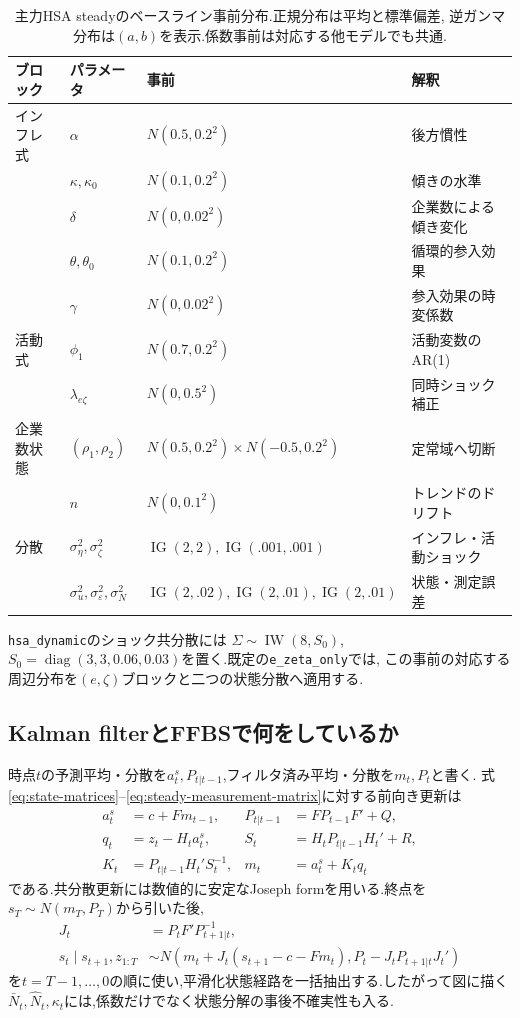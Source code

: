 \documentclass[11pt]{article}
\newcommand{\code}[1]{\texttt{#1}}
\newcommand{\kt}{\kappa_t}
\begin{document}
\begin{table}[H]
\centering
\caption{主力HSA steadyのベースライン事前分布.正規分布は平均と標準偏差,
逆ガンマ分布は$(a,b)$を表示.係数事前は対応する他モデルでも共通.}
\label{tab:baseline-priors}
\small
\begin{tabular}{llll}
\toprule
ブロック & パラメータ & 事前 & 解釈 \\
\midrule
インフレ式 & $\alpha$ & $N(0.5,0.2^2)$ & 後方慣性 \\
 & $\kappa,\kappa_0$ & $N(0.1,0.2^2)$ & 傾きの水準 \\
 & $\delta$ & $N(0,0.02^2)$ & 企業数による傾き変化 \\
 & $\theta,\theta_0$ & $N(0.1,0.2^2)$ & 循環的参入効果 \\
 & $\gamma$ & $N(0,0.02^2)$ & 参入効果の時変係数 \\
活動式 & $\phi_1$ & $N(0.7,0.2^2)$ & 活動変数のAR(1) \\
 & $\lambda_{e\zeta}$ & $N(0,0.5^2)$ & 同時ショック補正 \\
企業数状態 & $(\rho_1,\rho_2)$ & $N(0.5,0.2^2)\times N(-0.5,0.2^2)$ & 定常域へ切断 \\
 & $n$ & $N(0,0.1^2)$ & トレンドのドリフト \\
\midrule
分散 & $\sigma_\eta^2,\sigma_\zeta^2$ & $\operatorname{IG}(2,2),\operatorname{IG}(.001,.001)$ & インフレ・活動ショック \\
 & $\sigma_u^2,\sigma_\varepsilon^2,\sigma_N^2$ & $\operatorname{IG}(2,.02),\operatorname{IG}(2,.01),\operatorname{IG}(2,.01)$ & 状態・測定誤差 \\
\bottomrule
\end{tabular}
\end{table}

\noindent \code{hsa\_dynamic}のショック共分散には
$\Sigma\sim\operatorname{IW}(8,S_0)$,
$S_0=\operatorname{diag}(3,3,0.06,0.03)$を置く.既定の\code{e\_zeta\_only}では,
この事前の対応する周辺分布を$(e,\zeta)$ブロックと二つの状態分散へ適用する.

\subsection{Kalman filterとFFBSで何をしているか}
時点$t$の予測平均・分散を$a_t^s,P_{t|t-1}$,フィルタ済み平均・分散を$m_t,P_t$と書く.
式\eqref{eq:state-matrices}--\eqref{eq:steady-measurement-matrix}に対する前向き更新は
\begin{align}
a_t^s&=c+Fm_{t-1},&P_{t|t-1}&=FP_{t-1}F'+Q,\\
q_t&=z_t-H_ta_t^s,&S_t&=H_tP_{t|t-1}H_t'+R,\\
K_t&=P_{t|t-1}H_t'S_t^{-1},&m_t&=a_t^s+K_tq_t
\end{align}
である.共分散更新には数値的に安定なJoseph formを用いる.終点を
$s_T\sim N(m_T,P_T)$から引いた後,
\begin{align}
J_t&=P_tF'P_{t+1|t}^{-1},\\
s_t\mid s_{t+1},z_{1:T}
&\sim N\!\left(m_t+J_t(s_{t+1}-c-Fm_t),
P_t-J_tP_{t+1|t}J_t'\right)
\end{align}
を$t=T-1,\ldots,0$の順に使い,平滑化状態経路を一括抽出する.したがって図に描く
$\bar N_t,\hat N_t,\kt$には,係数だけでなく状態分解の事後不確実性も入る.
\end{document}
